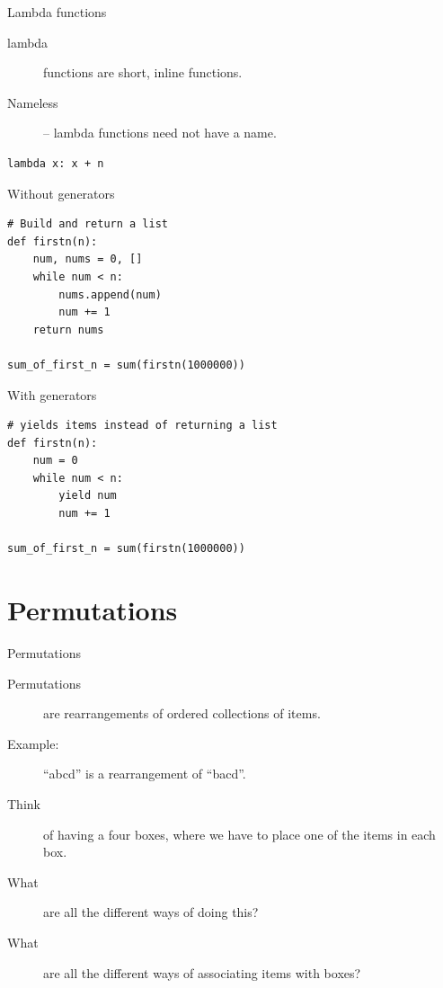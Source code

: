 \begin{frame}[fragile]{Lambda functions}
	\begin{description}
	  \item[lambda] functions are short, inline functions.
	  \item[Nameless] -- lambda functions need not have a name.
	\end{description}
	\begin{verbatim}
lambda x: x + n
  \end{verbatim}
\end{frame}



\begin{frame}[fragile]{Without generators}
	\begin{verbatim}
# Build and return a list
def firstn(n):
    num, nums = 0, []
    while num < n:
        nums.append(num)
        num += 1
    return nums

sum_of_first_n = sum(firstn(1000000))
  \end{verbatim}
\end{frame}

\begin{frame}[fragile]{With generators}
	\begin{verbatim}
# yields items instead of returning a list
def firstn(n):
    num = 0
    while num < n:
        yield num
        num += 1

sum_of_first_n = sum(firstn(1000000))
  \end{verbatim}
\end{frame}

\section{Permutations}


\begin{frame}{Permutations}
	\begin{description}
		\item[Permutations] are rearrangements of ordered collections of items.
		\item[Example:] ``abcd'' is a rearrangement of ``bacd''.
		\item[Think] of having a four boxes, where we have to place one of the items in each box.
		\item[What] are all the different ways of doing this?
		\item[What] are all the different ways of associating items with boxes?
	\end{description}
\end{frame}

